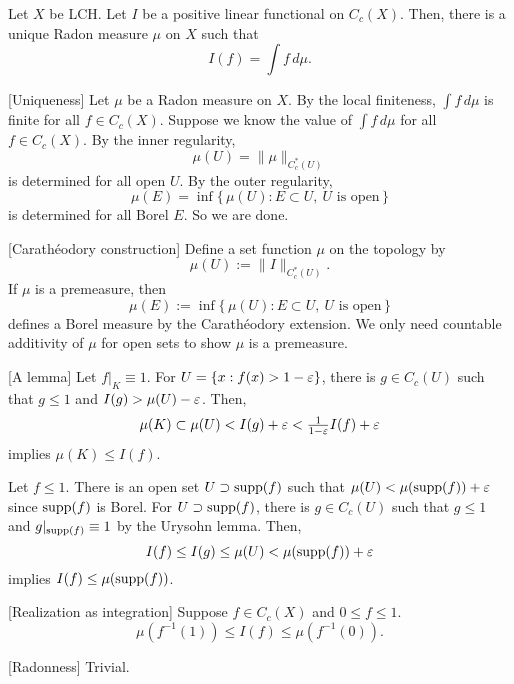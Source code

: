 \documentclass{../note}
\begin{document}
\begin{thm}
Let $X$ be LCH.
Let $I$ be a positive linear functional on $C_c(X)$.
Then, there is a unique Radon measure $\mu$ on $X$ such that
\[I(f)=\int f\,d\mu.\]
\end{thm}
\begin{pf}
[Uniqueness]
Let $\mu$ be a Radon measure on $X$.
By the local finiteness, $\int f\,d\mu$ is finite for all $f\in C_c(X)$.
Suppose we know the value of $\int f\,d\mu$ for all $f\in C_c(X)$.
By the inner regularity,
\[\mu(U)=\|\mu\|_{C_c^*(U)}\]
is determined for all open $U$.
By the outer regularity,
\[\mu(E)=\inf\{\,\mu(U):E\subset U,\ U\text{ is open}\,\}\]
is determined for all Borel $E$.
So we are done.

[Carath\'eodory construction]
Define a set function $\mu$ on the topology by
\[\mu(U):=\|I\|_{C_c^*(U)}.\]
If $\mu$ is a premeasure, then
\[\mu(E):=\inf\{\,\mu(U):E\subset U,\ U\text{ is open}\,\}\]
defines a Borel measure by the Carath\'eodory extension.
We only need countable additivity of $\mu$ for open sets to show $\mu$ is a premeasure.

[A lemma]
Let $f|_K\equiv1$.
For $U=\{x:f(x)>1-\varepsilon\}$, there is $g\in C_c(U)$ such that $g\le1$ and $I(g)>\mu(U)-\varepsilon$.
Then,
\[\mu(K)\subset\mu(U)<I(g)+\varepsilon<\tfrac1{1-\varepsilon}I(f)+\varepsilon\]
implies $\mu(K)\le I(f)$.

Let $f\le1$.
There is an open set $U\supset\operatorname{supp}(f)$ such that $\mu(U)<\mu(\operatorname{supp}(f))+\varepsilon$ since $\operatorname{supp}(f)$ is Borel.
For $U\supset\operatorname{supp}(f)$, there is $g\in C_c(U)$ such that $g\le1$ and $g|_{\operatorname{supp}(f)}\equiv1$ by the Urysohn lemma.
Then,
\[I(f)\le I(g)\le\mu(U)<\mu(\operatorname{supp}(f))+\varepsilon\]
implies $I(f)\le\mu(\operatorname{supp}(f))$.

[Realization as integration]
Suppose $f\in C_c(X)$ and $0\le f\le1$.
\[\mu(f^{-1}(1))\le I(f)\le\mu(f^{-1}(0)).\]


[Radonness]
Trivial.


\end{pf}
\end{document}
